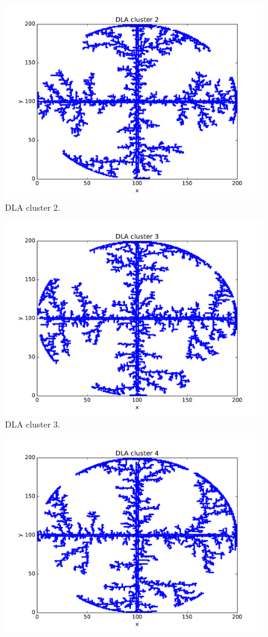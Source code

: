\documentclass[aps,prl,preprint,superscriptaddress]{revtex4}
\begin{document}
\begin{enumerate}
				\begin{figure}[H]
			\centering
			\includegraphics[width=1.0\textwidth]{dla_1.pdf}
			\caption{DLA cluster 2.}
		\end{figure}
				\begin{figure}[H]
			\centering
			\includegraphics[width=1.0\textwidth]{dla_2.pdf}
			\caption{DLA cluster 3.}
		\end{figure}
				\begin{figure}[H]
			\centering
			\includegraphics[width=1.0\textwidth]{dla_3.pdf}

\end{figure}
\end{enumerate}
\end{document}
